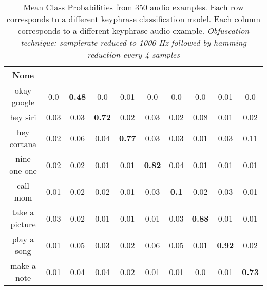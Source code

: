 \begin{table}[!th]
\begin{tabular}{cccccccccc}%
\hline%
None&\rotate{random talk}{70}&\rotate{okay google}{70}&\rotate{hey siri}{70}&\rotate{hey cortana}{70}&\rotate{nine one one}{70}&\rotate{call mom}{70}&\rotate{take a picture}{70}&\rotate{play a song}{70}&\rotate{make a note}{70}\\%
\hline%
okay google&0.0&\textbf{0.48}&0.0&0.01&0.0&0.0&0.0&0.01&0.0\\%
hey siri&0.03&0.03&\textbf{0.72}&0.02&0.03&0.02&0.08&0.01&0.02\\%
hey cortana&0.02&0.06&0.04&\textbf{0.77}&0.03&0.03&0.01&0.03&0.11\\%
nine one one&0.02&0.02&0.01&0.01&\textbf{0.82}&0.04&0.01&0.01&0.01\\%
call mom&0.01&0.02&0.02&0.01&0.03&\textbf{0.1}&0.02&0.03&0.01\\%
take a picture&0.03&0.02&0.01&0.01&0.01&0.03&\textbf{0.88}&0.01&0.01\\%
play a song&0.01&0.05&0.03&0.02&0.06&0.05&0.01&\textbf{0.92}&0.02\\%
make a note&0.01&0.04&0.04&0.02&0.01&0.01&0.0&0.01&\textbf{0.73}\\%
\hline%
\end{tabular}
\caption{Mean Class Probabilities from 350 audio examples. Each row corresponds to a different keyphrase classification model. Each column corresponds to a different keyphrase audio example. \emph{Obfuscation technique: samplerate reduced to 1000 Hz followed by hamming reduction every 4 samples}}
\label{tab:probs_samplerate_1000_hamming_4}
\end{table}








